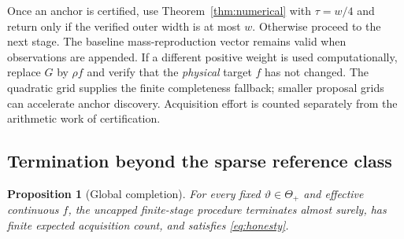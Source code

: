 \documentclass[10pt]{amsart}
\newtheorem{proposition}[theorem]{Proposition}
\theoremstyle{definition}
\theoremstyle{remark}
\newcommand{\ThetaAll}{\Theta_+}
\begin{document}
Once an anchor is certified, use Theorem~\ref{thm:numerical} with $\tau=w/4$ and return only if the verified outer width is at most $w$. Otherwise proceed to the next stage. The baseline mass-reproduction vector remains valid when observations are appended. If a different positive weight is used computationally, replace $G$ by $\rho f$ and verify that the \emph{physical} target $f$ has not changed. The quadratic grid supplies the finite completeness fallback; smaller proposal grids can accelerate anchor discovery. Acquisition effort is counted separately from the arithmetic work of certification.

\subsection{Termination beyond the sparse reference class}
\begin{proposition}[Global completion]\label{prop:complete}
For every fixed $\vartheta\in\ThetaAll$ and effective continuous $f$, the uncapped finite-stage procedure terminates almost surely, has finite expected acquisition count, and satisfies \eqref{eq:honesty}.
\end{proposition}
\end{document}
